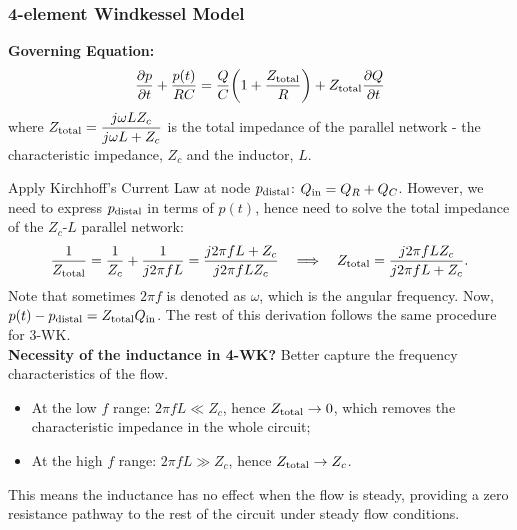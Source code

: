 \documentclass[a4paper]{article}
\begin{document}
\subsubsection*{4-element Windkessel Model}
\begin{minipage}{0.5\textwidth}

\end{minipage}
\hfill
\begin{minipage}{0.5\textwidth}
\textbf{Governing Equation:}
\[
    \frac{\partial p}{\partial t}
    + \frac{p(t)}{RC} 
    = \frac{Q}{C} \bigg(1+\frac{Z_{\rm{total}}}{R} \bigg)
    + Z_{\rm{total}}\frac{\partial Q}{\partial t}
\]
where $\displaystyle Z_{\rm{total}} = \frac{j\omega L Z_{c}}{j\omega L + Z_{c}}$ is the \rm{total} impedance of the parallel network - the characteristic impedance, $Z_{c}$ and the inductor, $L$. 
\end{minipage}

\begin{tcolorbox}[title=\textbf{Derivation}, breakable]
    Apply Kirchhoff's Current Law at node $p_{\rm distal}$: $Q_{\rm in} = Q_{R} + Q_{C}$. However, we need to express $p_{\rm distal}$ in terms of $p(t)$, hence need to solve the total impedance of the $Z_c$-$L$ parallel network:
    \[
        \frac{1}{Z_{\rm{total}}} = \frac{1}{Z_c} + \frac{1}{j2\pi f L} = \frac{j2\pi f L + Z_c}{j2\pi f L Z_c} 
        \quad \Longrightarrow \quad 
        Z_{\rm{total}} = \frac{j2\pi f L Z_c}{j2\pi f L + Z_c}.
    \]
    Note that sometimes $2\pi f$ is denoted as $\omega$, which is the angular frequency. Now, $p(t)-p_{\rm distal} = Z_{\rm{total}}Q_{\rm in}$. The rest of this derivation follows the same procedure for 3-WK.\\

    \textbf{Necessity of the inductance in 4-WK?} Better capture the frequency characteristics of the flow.
    \begin{itemize}
        \item At the low $f$ range: $2 \pi fL \ll Z_c$, hence $Z_{\rm{total}} \to 0$, which removes the characteristic impedance in the whole circuit;
        
        \item At the high $f$ range: $2 \pi fL \gg Z_c$, hence $Z_{\rm{total}} \to Z_c$.
    \end{itemize}
    This means the inductance has no effect when the flow is steady, providing a zero resistance pathway to the rest of the circuit under steady flow conditions.
\end{tcolorbox}
\end{document}
